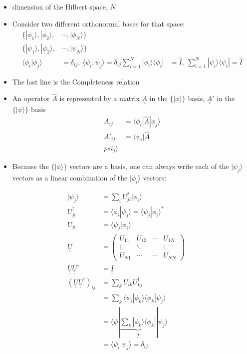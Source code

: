 \documentclass[a4paper,11pt,normalem]{article}
\begin{document}
\begin{itemize}
\item
  dimension of the Hilbert space, \(N\)
\item
  Consider two different orthonormal bases for that space:
\[
    \begin{aligned}
    \{|\phi_1\rangle,|\phi_2\rangle,&\cdots,|\phi_N\rangle\} \\
    \{|\psi_1\rangle,|\psi_2\rangle,&\cdots,|\psi_N\rangle\} \\
    \langle\phi_i|\phi_j\rangle &= \delta_{ij},~ \langle\psi_i,\psi_j\rangle = \delta_{ij}
    \sum_{i=1}^N |\phi_i\rangle\langle\phi_i| &= \hat{I},~ \sum_{i=1}^N |\psi_i\rangle\langle\psi_i| = \hat{I}
    \end{aligned}
\]
\item
  The last line is the Completeness relation
\item
  An operator \(\hat{A}\) is represented by a matrix
  \(\underline{\underline{A}}\) in the \(\{|\phi\rangle\}\) basis,
  \(\underline{\underline{A}}'\) in the \(\{|\psi\rangle\}\) basis
\[
    \begin{aligned}
    A_{ij} &= \langle\phi_i|\hat{A}|\phi_j\rangle \\
    A'_{ij} &= \langle\psi_i|\hat{A}\\psi_j\rangle
    \end{aligned}
\]
\item
  Because the \(\{|\phi\rangle\}\) vectors are a basis, one can always
  write each of the \(|\psi_j\rangle\) vectors as a linear combination
  of the \(|\phi_i\rangle\) vectors:
\end{itemize}

\[
    \begin{aligned}
    |\psi_j\rangle &= \sum_i U_{ji}^* |\phi_i\rangle \\
    U_{ji}^\dagger &= \langle\phi_i|\psi_j\rangle = \langle\psi_j|\phi_i\rangle^* \\
    U_{ji} &= \langle\psi_j|\phi_i\rangle \\
    \underline{\underline{U}} &= \begin{pmatrix} U_{11} & U_{12} & \cdots & U_{1N} \\ \vdots & \ddots & & \vdots \\ U_{N1} & \cdots & \cdots & U_{NN} \end{pmatrix} \\
    \underline{\underline{U}}\underline{\underline{U}}^\dagger &= \underline{\underline{I}} \\
    (\underline{\underline{U}}\underline{\underline{U}}^\dagger)_{ij} &= \sum_k U_{ik}U_{kj}^\dagger \\
    &= \sum_k \langle\psi_i|\phi_k\rangle\langle\phi_k|\psi_j\rangle \\
    &= \langle\psi|\underbrace{\sum_k |\phi_k\rangle\langle\phi_k|}_{\hat{I}}|\psi_j\rangle \\
    &= \langle\psi_i|\psi_j\rangle = \delta_{ij}
    \end{aligned}
\]
\end{document}
